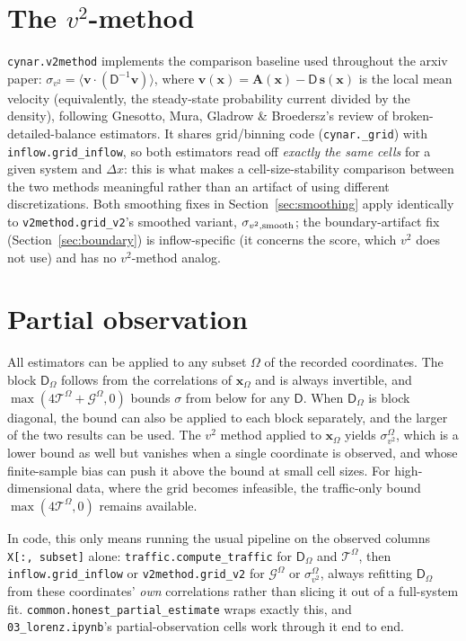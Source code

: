 \documentclass[11pt]{article}
\newcommand{\traffic}{\mathcal{T}}
\newcommand{\inflow}{\mathcal{G}}
\newcommand{\MD}{{\mathsf{D}}}
\newcommand{\xx}{{\bm{x}}}
\newcommand{\subs}{\Omega}
\begin{document}
\section{The $v^2$-method}
\label{sec:v2}

\texttt{cynar.v2method} implements the comparison baseline used throughout the arxiv paper: $\sigma_{v^2} = \langle\bm v\cdot(\MD^{-1}\bm v)\rangle$, where $\bm v(\bm x) = \bm A(\bm x) - \MD\,\bm s(\bm x)$ is the local mean velocity (equivalently, the steady-state probability current divided by the density), following Gnesotto, Mura, Gladrow \& Broedersz's review of broken-detailed-balance estimators. It shares grid/binning code (\texttt{cynar.\_grid}) with \texttt{inflow.grid\_inflow}, so both estimators read off \emph{exactly the same cells} for a given system and $\Delta x$: this is what makes a cell-size-stability comparison between the two methods meaningful rather than an artifact of using different discretizations. Both smoothing fixes in Section~\ref{sec:smoothing} apply identically to \texttt{v2method.grid\_v2}'s smoothed variant, $\sigma_{v^2,\rm smooth}$; the boundary-artifact fix (Section~\ref{sec:boundary}) is inflow-specific (it concerns the score, which $v^2$ does not use) and has no $v^2$-method analog.

\section{Partial observation}
\label{sec:partial}

All estimators can be applied to any subset $\subs$ of the recorded coordinates. The block $\MD_\subs$ follows from the correlations of $\xx_\subs$ and is always invertible, and $\max(4\traffic^\subs+\inflow^\subs,0)$ bounds $\sigma$ from below for any $\MD$. When $\MD_\subs$ is block diagonal, the bound can also be applied to each block separately, and the larger of the two results can be used. The $v^2$ method applied to $\xx_\subs$ yields $\sigma_{v^2}^\subs$, which is a lower bound as well but vanishes when a single coordinate is observed, and whose finite-sample bias can push it above the bound at small cell sizes. For high-dimensional data, where the grid becomes infeasible, the traffic-only bound $\max(4\traffic^\subs,0)$ remains available.

In code, this only means running the usual pipeline on the observed columns \texttt{X[:, subset]} alone: \texttt{traffic.compute\_traffic} for $\MD_\subs$ and $\traffic^\subs$, then \texttt{inflow.grid\_inflow} or \texttt{v2method.grid\_v2} for $\inflow^\subs$ or $\sigma_{v^2}^\subs$, always refitting $\MD_\subs$ from these coordinates' \emph{own} correlations rather than slicing it out of a full-system fit. \texttt{common.honest\_partial\_estimate} wraps exactly this, and \texttt{03\_lorenz.ipynb}'s partial-observation cells work through it end to end.
\end{document}
